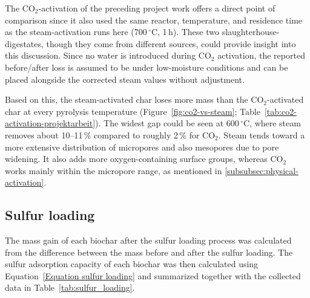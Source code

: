 The CO$_2$-activation of the preceding project work offers a direct point of comparison since it also used the same reactor, temperature, and residence time as the steam-activation runs here (700\,$^{\circ}$C, 1\,h). These two slaughterhouse-digestates, though they come from different sources, could provide insight into this discussion. Since no water is introduced during CO$_2$ activation, the reported before/after loss is assumed to be under low-moisture conditions and can be placed alongside the corrected steam values without adjustment. 

\vspace{0.3em}

Based on this, the steam-activated char loses more mass than the CO$_2$-activated char at every pyrolysis temperature (Figure~\ref{fig:co2-vs-steam}; Table~\ref{tab:co2-activation-projektarbeit}). The widest gap could be seen at 600\,$^{\circ}$C, where steam removes about 10--11\,\% compared to roughly 2\,\% for CO$_2$. Steam tends toward a more extensive distribution of micropores and also mesopores due to pore widening. It also adds more oxygen-containing surface groups, whereas CO$_2$ works mainly within the micropore range, as mentioned in \ref{subsubsec:physical-activation}. 

\subsection{Sulfur loading}
\label{subsec:results-sulfur}
The mass gain of each biochar after the sulfur loading process was calculated from the difference between the mass before and after the sulfur loading. The sulfur adsorption capacity of each biochar was then calculated using Equation~\ref{Equation sulfur loading} and summarized together with the collected data in Table~\ref{tab:sulfur_loading}. 

